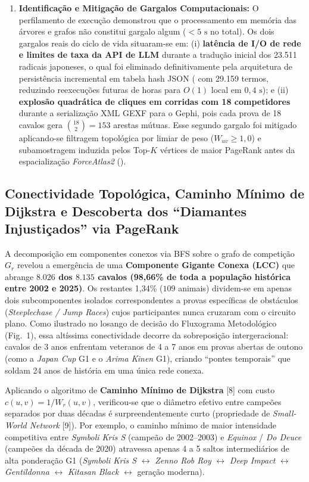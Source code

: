 \documentclass[conference]{IEEEtran}
\begin{document}
\begin{enumerate}
    \item \textbf{Identificação e Mitigação de Gargalos Computacionais:} O perfilamento de execução demonstrou que o processamento em memória das árvores e grafos não constitui gargalo algum ($< 5\text{ s}$ no total). Os dois gargalos reais do ciclo de vida situaram-se em: (i) \textbf{latência de I/O de rede e limites de taxa da API de LLM} durante a tradução inicial dos 23.511 radicais japoneses, o qual foi eliminado definitivamente pela arquitetura de persistência incremental em tabela hash JSON ( com 29.159 termos, reduzindo reexecuções futuras de horas para $O(1)$ local em $0,4\text{ s}$); e (ii) \textbf{explosão quadrática de cliques em corridas com 18 competidores} durante a serialização XML GEXF para o Gephi, pois cada prova de 18 cavalos gera $\binom{18}{2} = 153$ arestas mútuas. Esse segundo gargalo foi mitigado aplicando-se filtragem topológica por limiar de peso ($W_{uv} \ge 1,0$) e subamostragem induzida pelos Top-$K$ vértices de maior PageRank antes da espacialização \textit{ForceAtlas2} ().
\end{enumerate}

\subsection{Conectividade Topológica, Caminho Mínimo de Dijkstra e Descoberta dos ``Diamantes Injustiçados'' via PageRank}
A decomposição em componentes conexos via BFS sobre o grafo de competição $G_r$ revelou a emergência de uma \textbf{Componente Gigante Conexa (LCC)} que abrange \textbf{$8.026$ dos $8.135$ cavalos (98,66\%
de toda a população histórica entre 2002 e 2025)}. Os restantes 1,34\%
($109$ animais) dividem-se em apenas dois subcomponentes isolados correspondentes a provas específicas de obstáculos (\textit{Steeplechase / Jump Races}) cujos participantes nunca cruzaram com o circuito plano. Como ilustrado no losango de decisão do Fluxograma Metodológico (Fig.~1), essa altíssima conectividade decorre da sobreposição intergeracional: cavalos de 3 anos enfrentam veteranos de 4 a 7 anos em provas abertas de outono (como a \textit{Japan Cup} G1 e o \textit{Arima Kinen} G1), criando ``pontes temporais'' que soldam 24 anos de história em uma única rede conexa.

Aplicando o algoritmo de \textbf{Caminho Mínimo de Dijkstra} [8] com custo $c(u, v) = 1 / W_r(u, v)$, verificou-se que o diâmetro efetivo entre campeões separados por duas décadas é surpreendentemente curto (propriedade de \textit{Small-World Network} [9]). Por exemplo, o caminho mínimo de maior intensidade competitiva entre \textit{Symboli Kris S} (campeão de 2002--2003) e \textit{Equinox} / \textit{Do Deuce} (campeões da década de 2020) atravessa apenas 4 a 5 saltos intermediários de alta ponderação G1 (\textit{Symboli Kris S} $\leftrightarrow$ \textit{Zenno Rob Roy} $\leftrightarrow$ \textit{Deep Impact} $\leftrightarrow$ \textit{Gentildonna} $\leftrightarrow$ \textit{Kitasan Black} $\leftrightarrow$ geração moderna).
\end{document}

